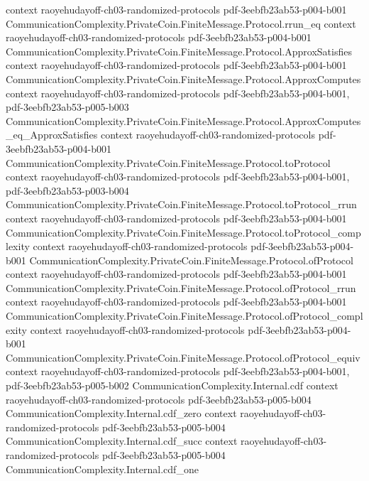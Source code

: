 \begin{theorem}
  {context}
  {raoyehudayoff-ch03-randomized-protocols}
  {pdf-3eebfb23ab53-p004-b001}
\proofstep
  {CommunicationComplexity.PrivateCoin.FiniteMessage.Protocol.rrun_eq}
  {context}
  {raoyehudayoff-ch03-randomized-protocols}
  {pdf-3eebfb23ab53-p004-b001}
\proofstep
  {CommunicationComplexity.PrivateCoin.FiniteMessage.Protocol.ApproxSatisfies}
  {context}
  {raoyehudayoff-ch03-randomized-protocols}
  {pdf-3eebfb23ab53-p004-b001}
\proofstep
  {CommunicationComplexity.PrivateCoin.FiniteMessage.Protocol.ApproxComputes}
  {context}
  {raoyehudayoff-ch03-randomized-protocols}
  {pdf-3eebfb23ab53-p004-b001,
    pdf-3eebfb23ab53-p005-b003}
\proofstep
  {CommunicationComplexity.PrivateCoin.FiniteMessage.Protocol.ApproxComputes_eq_ApproxSatisfies}
  {context}
  {raoyehudayoff-ch03-randomized-protocols}
  {pdf-3eebfb23ab53-p004-b001}
\proofstep
  {CommunicationComplexity.PrivateCoin.FiniteMessage.Protocol.toProtocol}
  {context}
  {raoyehudayoff-ch03-randomized-protocols}
  {pdf-3eebfb23ab53-p004-b001,
    pdf-3eebfb23ab53-p003-b004}
\proofstep
  {CommunicationComplexity.PrivateCoin.FiniteMessage.Protocol.toProtocol_rrun}
  {context}
  {raoyehudayoff-ch03-randomized-protocols}
  {pdf-3eebfb23ab53-p004-b001}
\proofstep
  {CommunicationComplexity.PrivateCoin.FiniteMessage.Protocol.toProtocol_complexity}
  {context}
  {raoyehudayoff-ch03-randomized-protocols}
  {pdf-3eebfb23ab53-p004-b001}
\proofstep
  {CommunicationComplexity.PrivateCoin.FiniteMessage.Protocol.ofProtocol}
  {context}
  {raoyehudayoff-ch03-randomized-protocols}
  {pdf-3eebfb23ab53-p004-b001}
\proofstep
  {CommunicationComplexity.PrivateCoin.FiniteMessage.Protocol.ofProtocol_rrun}
  {context}
  {raoyehudayoff-ch03-randomized-protocols}
  {pdf-3eebfb23ab53-p004-b001}
\proofstep
  {CommunicationComplexity.PrivateCoin.FiniteMessage.Protocol.ofProtocol_complexity}
  {context}
  {raoyehudayoff-ch03-randomized-protocols}
  {pdf-3eebfb23ab53-p004-b001}
\proofstep
  {CommunicationComplexity.PrivateCoin.FiniteMessage.Protocol.ofProtocol_equiv}
  {context}
  {raoyehudayoff-ch03-randomized-protocols}
  {pdf-3eebfb23ab53-p004-b001,
    pdf-3eebfb23ab53-p005-b002}
\proofstep
  {CommunicationComplexity.Internal.cdf}
  {context}
  {raoyehudayoff-ch03-randomized-protocols}
  {pdf-3eebfb23ab53-p005-b004}
\proofstep
  {CommunicationComplexity.Internal.cdf_zero}
  {context}
  {raoyehudayoff-ch03-randomized-protocols}
  {pdf-3eebfb23ab53-p005-b004}
\proofstep
  {CommunicationComplexity.Internal.cdf_succ}
  {context}
  {raoyehudayoff-ch03-randomized-protocols}
  {pdf-3eebfb23ab53-p005-b004}
\proofstep
  {CommunicationComplexity.Internal.cdf_one}

\end{theorem}
